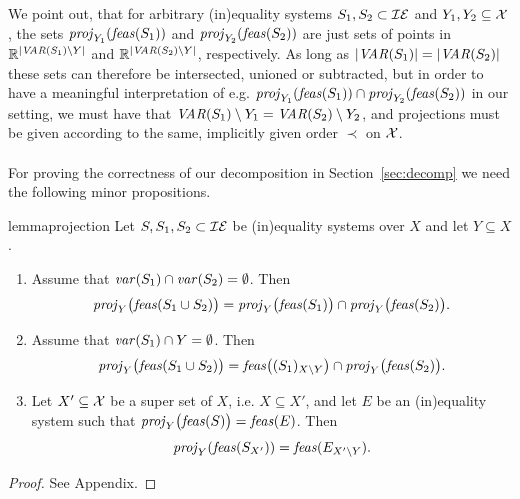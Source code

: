 We point out, that for arbitrary (in)equality systems $S_1,S_2\subset \mathcal{IE}$ and $Y_1,Y_2\subseteq \mathcal{X}$, the sets $\mathit{proj}_{Y_1}(\mathit{feas}(S_1))$ and $\mathit{proj}_{Y_2}(\mathit{feas}(S_2))$ are just sets of points in $\mathbb{R}^{|\mathit{VAR}(S_1)\setminus Y|}$ and $\mathbb{R}^{|\mathit{VAR}(S_2)\setminus Y|}$, respectively. As long as $|\mathit{VAR}(S_1)|=|\mathit{VAR}(S_2)|$ these sets can therefore be intersected, unioned or subtracted, but in order to have a meaningful interpretation of 
e.g. $\mathit{proj}_{Y_1}(\mathit{feas}(S_1))\cap\mathit{proj}_{Y_2}(\mathit{feas}(S_2))$ in our setting, we must have that $\mathit{VAR}(S_1)\setminus Y_1 = \mathit{VAR}(S_2)\setminus Y_2$, and projections must be given according to the same, implicitly given order $\prec$ on $\mathcal{X}$.
%
\\\\
For proving the correctness of our decomposition in Section~\ref{sec:decomp} we need the following minor propositions.
\begin{restatable}{lemma}{projection}\label{lm:projection}
Let $S, S_1, S_2\subset\mathcal{IE}$ be (in)equality systems over $X$ and let $Y\subseteq X$. 
\begin{enumerate}
\item\label{lm:1.1} Assume that $\mathit{var}(S_1)\cap\mathit{var}(S_2) = \emptyset$. Then 
\begin{equation}\label{eq:lm1.1}
\mathit{proj}_Y\big(\mathit{feas}(S_1\cup S_2)\big) = \mathit{proj}_Y\big(\mathit{feas}(S_1)\big)\cap \mathit{proj}_Y\big(\mathit{feas}(S_2)\big).
\end{equation}
\item\label{lm:1.2} Assume that $\mathit{var}(S_1)\cap Y = \emptyset$. Then
\begin{equation}
\mathit{proj}_Y\big(\mathit{feas}(S_1\cup S_2)\big) = \mathit{feas}\big((S_1)_{X\setminus Y}\big)\cap \mathit{proj}_Y\big(\mathit{feas}(S_2)\big).
\end{equation}
\item\label{lm:1.3} Let $X'\subseteq \mathcal{X}$ be a super set of $X$, i.e. $X\subseteq X'$, and let $E$ be an (in)equality system such that $\mathit{proj}_Y\big(\mathit{feas}(S)\big) = \mathit{feas}(E)$.
Then 
\[
\mathit{proj}_Y(\mathit{feas}(S_{X'})) = \mathit{feas}(E_{X'\setminus Y}).
\]
\end{enumerate}
\end{restatable}
\begin{proof} See Appendix.
\end{proof}
